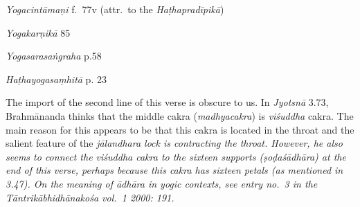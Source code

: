 \begin{ekdosis}
\begin{testimonia}[hp03_070]
\emph{Yogacintāmaṇi} f.~77v (attr.~to the \emph{Haṭhapradīpikā})
\begin{versinnote}
\end{versinnote}

\emph{Yogakarṇikā} 85
\begin{versinnote}
\end{versinnote}

\emph{Yogasarasaṅgraha} p.58
\begin{versinnote}
\end{versinnote}

\emph{Haṭhayogasaṃhitā} p. 23
\begin{versinnote}
\end{versinnote}
\end{testimonia}

\begin{philcomm}[hp03_070]
The import of the second line of this verse is obscure to us. In \emph{Jyotsnā} 3.73, Brahmānanda thinks that the middle cakra (\emph{madhyacakra}) is \emph{viśuddha} cakra. The main reason for this appears to be that this cakra is located in the throat and the salient feature of the \sl{jālandhara} lock is contracting the throat. However, he also seems to connect the \emph{viśuddha} cakra to the sixteen supports (\emph{ṣoḍaśādhāra}) at the end of this verse, perhaps because this cakra has sixteen petals (as mentioned in 3.47). On the meaning of \emph{ādhāra} in yogic contexts, see entry no.~3 in the \emph{Tāntrikābhidhānakośa} vol.~1 2000: 191.
\end{philcomm}



\end{ekdosis}

